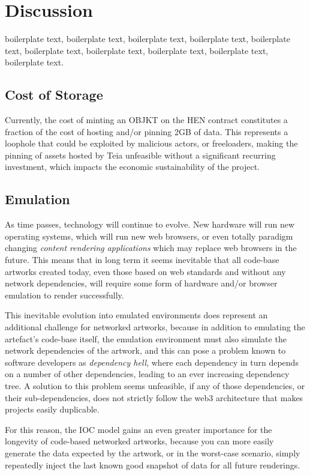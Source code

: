 \chapter{Discussion}


boilerplate text, boilerplate text, boilerplate text, boilerplate text, boilerplate text, boilerplate text, boilerplate text, boilerplate text, boilerplate text, boilerplate text.


\section{Cost of Storage}

Currently, the cost of minting an OBJKT on the HEN contract constitutes a fraction of the cost of hosting and/or pinning 2GB of data. This represents a loophole that could be exploited by malicious actors, or freeloaders, making the pinning of assets hosted by Teia unfeasible without a significant recurring investment, which impacts the economic sustainability of the project.

\section{Emulation}

As time passes, technology will continue to evolve. New hardware will run new operating systems, which will run new web browsers, or even totally paradigm changing \emph{content rendering applications} which may replace web browsers in the future. This means that in long term it seems inevitable that all code-base artworks created today, even those based on web standards and without any network dependencies, will require some form of hardware and/or browser emulation to render successfully. 

This inevitable evolution into emulated environments does represent an additional challenge for networked artworks, because in addition to emulating the artefact's code-base itself, the emulation environment must also simulate the network dependencies of the artwork, and this can pose a problem known to software developers as \emph{dependency hell}, where each dependency in turn depends on a number of other dependencies, leading to an ever increasing dependency tree. A solution to this problem seems unfeasible, if any of those dependencies, or their sub-dependencies, does not strictly follow the web3 architecture that makes projects easily duplicable.

For this reason, the IOC model gains an even greater importance for the longevity of code-based networked artworks, because you can more easily generate the data expected by the artwork, or in the worst-case scenario, simply repeatedly inject the last known good snapshot of data for all future renderings.

